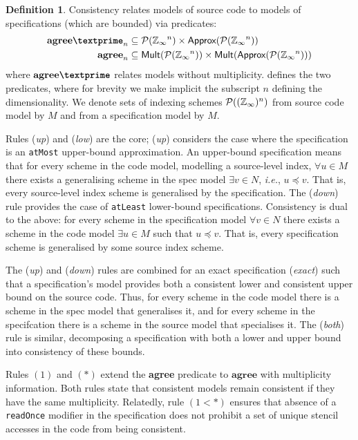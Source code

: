 \documentclass[10pt,preprint]{sigplanconf}
\newcounter{block}
\theoremstyle{definition}
\newtheorem{definition}[block]{Definition}
\newcommand{\ie}{\emph{i.e.}}
\newcommand{\term}[1]{\texttt{#1}}
\newcommand{\consName}{\textbf{agree\textprime}}
\newcommand{\consAName}{\textbf{agree}}
\begin{document}
\begin{definition}
Consistency relates models of source code to models
of specifications (which are bounded) via predicates:
\begin{align*}
\consName_n & \subseteq \mathcal{P}(\domainVal{}^n)
\times \textsf{Approx}(\mathcal{P}(\domainVal{}^n)) \\
\consAName_n & \subseteq \textsf{Mult}(\mathcal{P}(\domainVal{}^n))
\times \textsf{Mult}(\textsf{Approx}(\mathcal{P}(\domainVal{}^n)))
\end{align*}
%
where $\consName$ relates models without multiplicity.
 defines the two predicates, where for
brevity we make implicit the subscript $n$ defining the
dimensionality.  We denote sets of indexing schemes
$\mathcal{P}((\mathbb{Z}_\infty{})^n)$
from source code model by $M$ and from a specification model by $M$.

Rules (\emph{up}) and (\emph{low}) are the core; (\emph{up})
considers the case where the specification is
an \term{atMost} upper-bound approximation.
An upper-bound specification means that for every scheme in the code
model, modelling a source-level index, $\forall u \in M$ there exists
a generalising scheme in the spec model $\exists v \in N$, \ie{}, $u
\preceq v$. That is, every source-level index scheme is generalised by the specification.
The (\emph{down}) rule provides the case of
\term{atLeast} lower-bound specifications. Consistency is dual to the above:
for every scheme in the specification model $\forall v \in N$ there
exists a scheme in the code model $\exists u \in M$ such that $u
\preceq v$. That is, every specification scheme is generalised by some source
index scheme.

The (\emph{up}) and (\emph{down}) rules are combined for an \textsf{exact}
specification (\textit{exact}) such that a specification's model
provides both a consistent lower and consistent upper bound on
the source code. Thus, for every scheme in the code model there
is a scheme in the spec model that generalises it, and for every
scheme in the specifcation there is a scheme in the source model that
specialises it.  The (\textit{both}) rule is similar, decomposing
a specification with both a lower and upper bound into
consistency of these bounds.

Rules $(1)$ and $(*)$ extend the \consName{}
predicate to $\consAName{}$ with
multiplicity information. Both rules
state that consistent models remain consistent if they
have the same multiplicity. Relatedly, rule $(1 < *)$ ensures
that absence of a \texttt{readOnce} modifier in the specification
does not prohibit a set of unique stencil accesses in the
code from being consistent.
\end{definition}
\end{document}
